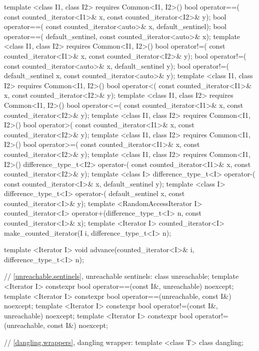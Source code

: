 \begin{codeblock}
{{{{  template <class I1, class I2>
      requires Common<I1, I2>()
    bool operator==(
      const counted_iterator<I1>& x, const counted_iterator<I2>& y);
    bool operator==(
      const counted_iterator<auto>& x, default_sentinel);
    bool operator==(
      default_sentinel, const counted_iterator<auto>& x);
  template <class I1, class I2>
      requires Common<I1, I2>()
    bool operator!=(
      const counted_iterator<I1>& x, const counted_iterator<I2>& y);
    bool operator!=(
      const counted_iterator<auto>& x, default_sentinel y);
    bool operator!=(
      default_sentinel x, const counted_iterator<auto>& y);
  template <class I1, class I2>
      requires Common<I1, I2>()
    bool operator<(
      const counted_iterator<I1>& x, const counted_iterator<I2>& y);
  template <class I1, class I2>
      requires Common<I1, I2>()
    bool operator<=(
      const counted_iterator<I1>& x, const counted_iterator<I2>& y);
  template <class I1, class I2>
      requires Common<I1, I2>()
    bool operator>(
      const counted_iterator<I1>& x, const counted_iterator<I2>& y);
  template <class I1, class I2>
      requires Common<I1, I2>()
    bool operator>=(
      const counted_iterator<I1>& x, const counted_iterator<I2>& y);
  template <class I1, class I2>
      requires Common<I1, I2>()
    difference_type_t<I2> operator-(
      const counted_iterator<I1>& x, const counted_iterator<I2>& y);
  template <class I>
    difference_type_t<I> operator-(
      const counted_iterator<I>& x, default_sentinel y);
  template <class I>
    difference_type_t<I> operator-(
      default_sentinel x, const counted_iterator<I>& y);
  template <RandomAccessIterator I>
    counted_iterator<I>
      operator+(difference_type_t<I> n, const counted_iterator<I>& x);
  template <Iterator I>
    counted_iterator<I> make_counted_iterator(I i, difference_type_t<I> n);

  template <Iterator I>
    void advance(counted_iterator<I>& i, difference_type_t<I> n);

  // \ref{unreachable.sentinels}, unreachable sentinels:
  class unreachable;
  template <Iterator I>
    constexpr bool operator==(const I&, unreachable) noexcept;
  template <Iterator I>
    constexpr bool operator==(unreachable, const I&) noexcept;
  template <Iterator I>
    constexpr bool operator!=(const I&, unreachable) noexcept;
  template <Iterator I>
    constexpr bool operator!=(unreachable, const I&) noexcept;

  // \ref{dangling.wrappers}, dangling wrapper:
  template <class T> class dangling;

}}}}
\end{codeblock}

